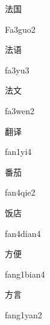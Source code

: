 \begin{verbete}[Fa3guo2]{法国}
\begin{pronuncia}{Fa3guo2}
\end{pronuncia}
\end{verbete}

\begin{verbete}[fa3yu3]{法语}
\begin{pronuncia}{fa3yu3}
\end{pronuncia}
\end{verbete}

\begin{verbete}[fa3wen2]{法文}
\begin{pronuncia}{fa3wen2}
\end{pronuncia}
\end{verbete}

\begin{verbete}[fan1yi4]{翻译}
\begin{pronuncia}{fan1yi4}
\end{pronuncia}
\end{verbete}

\begin{verbete}{番茄}
\begin{pronuncia}{fan4qie2}
\end{pronuncia}
\end{verbete}

\begin{verbete}{饭店}
\begin{pronuncia}{fan4dian4}
\end{pronuncia}
\end{verbete}

\begin{verbete}{方便}
\begin{pronuncia}{fang1bian4}
\end{pronuncia}
\end{verbete}

\begin{verbete}{方言}
\begin{pronuncia}{fang1yan2}
\end{pronuncia}
\end{verbete}

